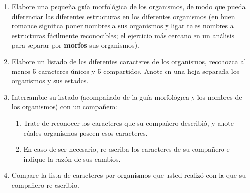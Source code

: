 \begin{enumerate}
	\item Elabore una peque\~na gu\'ia morfol\'ogica de los organismos, de modo que pueda diferenciar las diferentes estructuras en los diferentes organismos (en buen romance significa poner nombres a sus organismos y ligar tales nombres a estructuras f\'acilmente reconocibles; el ejercicio m\'as cercano en un an\'alisis para separar por \textbf{morfos} sus organismos).

	\item Elabore un listado de los diferentes caracteres de los organismos, reconozca al menos 5 caracteres \'unicos y 5 compartidos. Anote en una hoja separada los organismos y sus estados.
	
	\item Intercambie su listado (acompa\~nado de la gu\'ia morfol\'ogica y los nombres de los organismos) con un compa\~nero: 
	
	\begin{enumerate}
		\item Trate de reconocer los caracteres que su compa\~nero describi\'o, y anote c\'uales organismos poseen esos caracteres.
		\item En caso de ser necesario, re-escriba los caracteres de su compa\~nero e indique la raz\'on de sus cambios.
	\end{enumerate}
	
	\item Compare la lista de caracteres por organismos que usted 
	realiz\'o con la que su compa\~nero re-escribio.

\end{enumerate}




